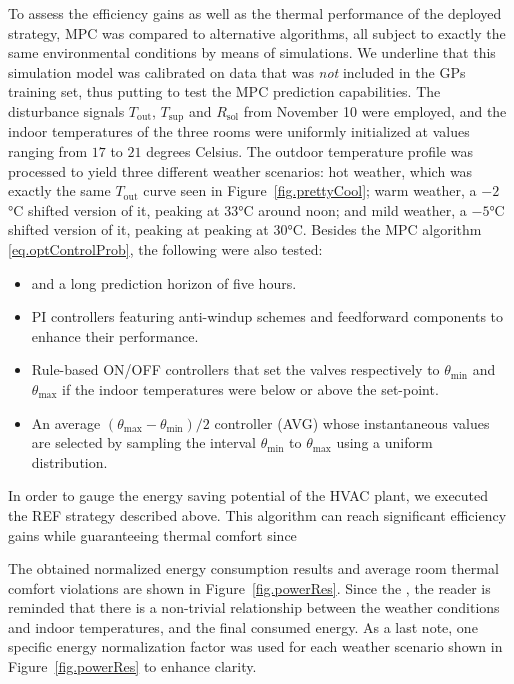 To assess the efficiency gains as well as the thermal performance of the deployed strategy, MPC was compared to alternative algorithms, all subject to exactly the same environmental conditions by means of simulations. We underline that this simulation model was calibrated on data that was \textit{not} included in the GPs training set, thus putting to test the MPC prediction capabilities. The disturbance signals $T_\text{out}$, $T_\text{sup}$ and $R_\text{sol}$ from November 10 were employed, and the indoor temperatures of the three rooms were uniformly initialized at values ranging from $17$ to $21$ degrees Celsius. The outdoor temperature profile was processed to yield three different weather scenarios: hot weather, which was exactly the same $T_\text{out}$ curve seen in Figure~\ref{fig.prettyCool}; warm weather, a $-2$°C shifted version of it, peaking at 33°C around noon; and mild weather, a $-5$°C shifted version of it, peaking at peaking at 30°C. Besides the MPC algorithm \eqref{eq.optControlProb}, the following were also tested:
\begin{itemize}
	\item {} and a long prediction horizon of five hours.
	\item PI controllers featuring anti-windup schemes and feedforward components to enhance their performance.
	\item Rule-based ON/OFF controllers that set the valves respectively to $\theta_\text{min}$ and $\theta_\text{max}$ if the indoor temperatures were below or above the set-point. 
	\item An average $(\theta_\text{max}-\theta_\text{min})/2$ controller (AVG) whose instantaneous values are selected by sampling the interval $\theta_\text{min}$ to $\theta_\text{max}$ using a uniform distribution.
\end{itemize}

In order to gauge the energy saving potential of the HVAC plant, we executed the REF strategy described above. This algorithm can reach significant efficiency gains while guaranteeing thermal comfort since 

The obtained normalized energy consumption results and average room thermal comfort violations are shown in Figure~\ref{fig.powerRes}. Since the , the reader is reminded that there is a non-trivial relationship between the weather conditions and indoor temperatures, and the final consumed energy.  As a last note, one specific energy normalization factor was used for each weather scenario shown in Figure~\ref{fig.powerRes} to enhance clarity.

